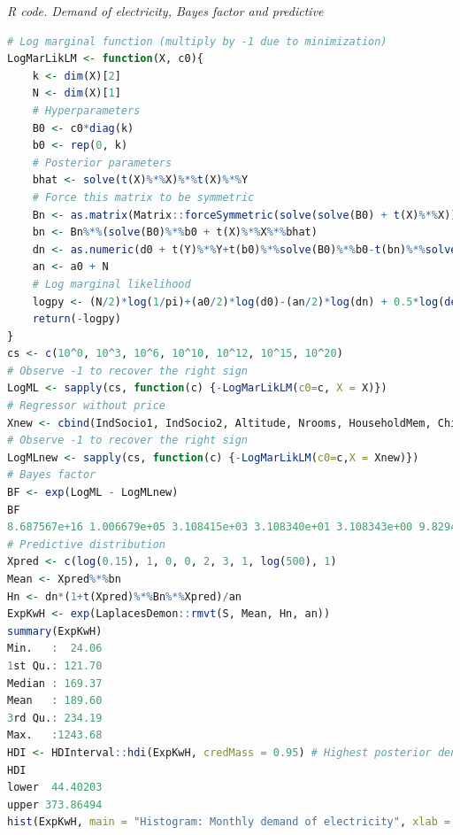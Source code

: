 \begin{tcolorbox}[enhanced,width=4.67in,center upper,
	fontupper=\large\bfseries,drop shadow southwest,sharp corners]
	\textit{R code. Demand of electricity, Bayes factor and predictive}
	\begin{VF}
		\begin{lstlisting}[language=R]
# Log marginal function (multiply by -1 due to minimization)
LogMarLikLM <- function(X, c0){
	k <- dim(X)[2]
	N <- dim(X)[1]	
	# Hyperparameters
	B0 <- c0*diag(k)
	b0 <- rep(0, k)
	# Posterior parameters
	bhat <- solve(t(X)%*%X)%*%t(X)%*%Y
	# Force this matrix to be symmetric
	Bn <- as.matrix(Matrix::forceSymmetric(solve(solve(B0) + t(X)%*%X))) 
	bn <- Bn%*%(solve(B0)%*%b0 + t(X)%*%X%*%bhat)
	dn <- as.numeric(d0 + t(Y)%*%Y+t(b0)%*%solve(B0)%*%b0-t(bn)%*%solve(Bn)%*%bn)
	an <- a0 + N
	# Log marginal likelihood
	logpy <- (N/2)*log(1/pi)+(a0/2)*log(d0)-(an/2)*log(dn) + 0.5*log(det(Bn)/det(B0)) + lgamma(an/2)-lgamma(a0/2)
	return(-logpy)
}
cs <- c(10^0, 10^3, 10^6, 10^10, 10^12, 10^15, 10^20)
# Observe -1 to recover the right sign
LogML <- sapply(cs, function(c) {-LogMarLikLM(c0=c, X = X)}) 
# Regressor without price
Xnew <- cbind(IndSocio1, IndSocio2, Altitude, Nrooms, HouseholdMem, Children, Lnincome, 1)
# Observe -1 to recover the right sign
LogMLnew <- sapply(cs, function(c) {-LogMarLikLM(c0=c,X = Xnew)})
# Bayes factor
BF <- exp(LogML - LogMLnew)
BF
8.687567e+16 1.006679e+05 3.108415e+03 3.108340e+01 3.108343e+00 9.829443e-02 3.108343e-04
# Predictive distribution
Xpred <- c(log(0.15), 1, 0, 0, 2, 3, 1, log(500), 1)
Mean <- Xpred%*%bn
Hn <- dn*(1+t(Xpred)%*%Bn%*%Xpred)/an
ExpKwH <- exp(LaplacesDemon::rmvt(S, Mean, Hn, an))
summary(ExpKwH)
Min.   :  24.06  
1st Qu.: 121.70  
Median : 169.37  
Mean   : 189.60  
3rd Qu.: 234.19  
Max.   :1243.68 
HDI <- HDInterval::hdi(ExpKwH, credMass = 0.95) # Highest posterior density credible interval
HDI
lower  44.40203
upper 373.86494
hist(ExpKwH, main = "Histogram: Monthly demand of electricity", xlab = "Monthly kWh", col = "blue", breaks = 50)
\end{lstlisting}
	\end{VF}
\end{tcolorbox} 

